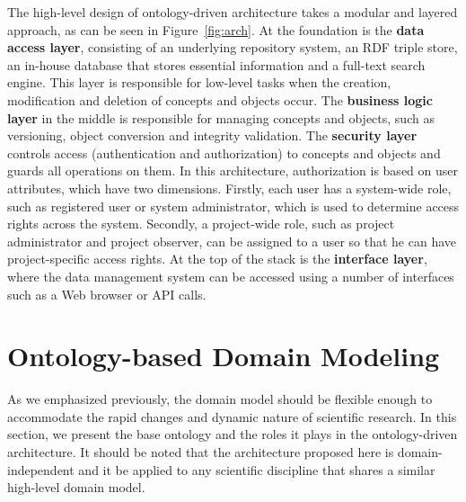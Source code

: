\documentclass{elsarticle}
\begin{document}
The high-level design of ontology-driven architecture takes a modular
and layered approach, as can be seen in Figure~\ref{fig:arch}.
At the foundation is the \textbf{data access layer},
consisting of an underlying repository system, an RDF triple store, an
in-house database that stores essential information and a full-text search
engine. This layer is responsible for low-level tasks when the creation,
modification and deletion of concepts and objects occur.
The \textbf{business logic layer} in the middle is responsible for
managing concepts and objects, such as versioning, object conversion
and integrity validation. The \textbf{security layer} controls access
(authentication and authorization) to concepts and objects and guards
all operations on them. In this architecture, authorization is based
on user attributes, which have two dimensions. Firstly, each user has
a system-wide role, such as registered user or system administrator, which
is used to determine access rights across the system.
Secondly, a project-wide role, such as project administrator and
project observer, can be assigned to a user so that he can have
project-specific access rights. At the top of the stack is
the \textbf{interface layer}, where the data management
system can be accessed using a number of interfaces such as a Web
browser or API calls.


\section{Ontology-based Domain Modeling}\label{sec:ont}

As we emphasized previously, the domain model should be flexible
enough to accommodate the rapid changes and dynamic nature of
scientific research. In this section, we present the base
ontology and the roles it plays in the ontology-driven
architecture. It should be noted that the architecture
proposed here is domain-independent and it be applied
to any scientific discipline that
shares a similar high-level domain model.
\end{document}
